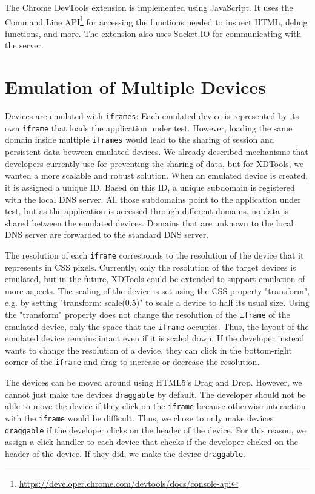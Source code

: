 The Chrome DevTools extension is implemented using JavaScript. It uses the Command Line API\footnote{\url{https://developer.chrome.com/devtools/docs/console-api}} for accessing the functions needed to inspect HTML, debug functions, and more. The extension also uses Socket.IO for communicating with the server. 

\section{Emulation of Multiple Devices}

Devices are emulated with \lstinline|iframes|: Each emulated device is represented by its own \lstinline|iframe| that loads the application under test. However, loading the same domain inside multiple \lstinline|iframes| would lead to the sharing of session and persistent data between emulated devices. We already described mechanisms that developers currently use for preventing the sharing of data, but for XDTools, we wanted a more scalable and robust solution. When an emulated device is created, it is assigned a unique ID. Based on this ID, a unique subdomain is registered with the local DNS server. All those subdomains point to the application under test, but as the application is accessed through different domains, no data is shared between the emulated devices. Domains that are unknown to the local DNS server are forwarded to the standard DNS server. 

The resolution of each \lstinline|iframe| corresponds to the resolution of the device that it represents in CSS pixels. Currently, only the resolution of the target devices is emulated, but in the future, XDTools could be extended to support emulation of more aspects. The scaling of the device is set using the CSS property "transform", e.g. by setting "transform: scale(0.5)" to scale a device to half its usual size. Using the "transform" property does not change the resolution of the \lstinline|iframe| of the emulated device, only the space that the \lstinline|iframe| occupies. Thus, the layout of the emulated device remains intact even if it is scaled down. If the developer instead wants to change the resolution of a device, they can click in the bottom-right corner of the \lstinline|iframe| and drag to increase or decrease the resolution. 

The devices can be moved around using HTML5's Drag and Drop. However, we cannot just make the devices \lstinline|draggable| by default. The developer should not be able to move the device if they click on the \lstinline|iframe| because otherwise interaction with the \lstinline|iframe| would be difficult. Thus, we chose to only make devices \lstinline|draggable| if the developer clicks on the header of the device. For this reason, we assign a click handler to each device that checks if the developer clicked on the header of the device. If they did, we make the device \lstinline|draggable|. 

